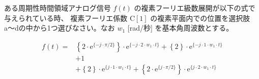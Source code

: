 ある周期性時間領域アナログ信号 $f(t)$ の複素フーリエ級数展開が以下の式で与えられている時、
複素フーリエ係数 $\textrm{C}[1]$ の複素平面内での位置を選択肢a〜dの中から1つ選びなさい。なお $w_1$ [rad/秒] を基本角周波数とする。

\begin{align*}
f(t) =
&  \left \{ 2 \cdot \textrm{e}^{\{ -j \cdot \pi/2 \}} \right \} \cdot \textrm{e}^{\{-j \cdot    2 \cdot w_1 \cdot t \}}
 + \left \{ 2 \right \} \cdot \textrm{e}^{\{-j \cdot    1 \cdot w_1 \cdot t \}} \\
&+ 1 \\
&+ \left \{ 2 \right \} \cdot \textrm{e}^{\{ j \cdot    1 \cdot w_1 \cdot t \}} 
 + \left \{ 2 \cdot \textrm{e}^{\{j \cdot \pi/2 \}} \right \} \cdot \textrm{e}^{\{ j \cdot    2 \cdot w_1 \cdot t \}} 
\end{align*}
